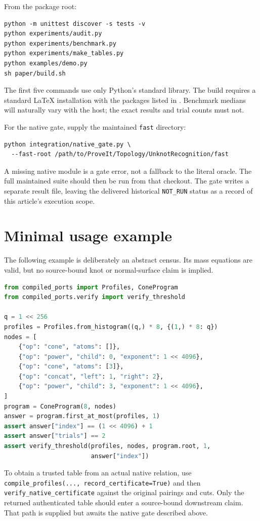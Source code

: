 From the package root:
\begin{lstlisting}
python -m unittest discover -s tests -v
python experiments/audit.py
python experiments/benchmark.py
python experiments/make_tables.py
python examples/demo.py
sh paper/build.sh
\end{lstlisting}
The first five commands use only Python's standard library. The build
requires a standard LaTeX installation with the packages listed in
. Benchmark medians will naturally vary with the host;
the exact results and trial counts must not.

For the native gate, supply the maintained \texttt{fast} directory:
\begin{lstlisting}
python integration/native_gate.py \
  --fast-root /path/to/ProveIt/Topology/UnknotRecognition/fast
\end{lstlisting}
A missing native module is a gate error, not a fallback to the literal
oracle. The full maintained suite should then be run from that checkout.
The gate writes a separate result file, leaving the delivered historical
\texttt{NOT\_RUN} status as a record of this article's execution scope.

\section{Minimal usage example}

The following example is deliberately an abstract census. Its mass equations
are valid, but no source-bound knot or normal-surface claim is implied.
\begin{lstlisting}[language=Python]
from compiled_ports import Profiles, ConeProgram
from compiled_ports.verify import verify_threshold

q = 1 << 256
profiles = Profiles.from_histogram((q,) * 8, {(1,) * 8: q})
nodes = [
    {"op": "cone", "atoms": []},
    {"op": "power", "child": 0, "exponent": 1 << 4096},
    {"op": "cone", "atoms": [3]},
    {"op": "concat", "left": 1, "right": 2},
    {"op": "power", "child": 3, "exponent": 1 << 4096},
]
program = ConeProgram(8, nodes)
answer = program.first_at_most(profiles, 1)
assert answer["index"] == (1 << 4096) + 1
assert answer["trials"] == 2
assert verify_threshold(profiles, nodes, program.root, 1,
                        answer["index"])
\end{lstlisting}

To obtain a trusted table from an actual native relation, use
\texttt{compile\_profiles(..., record\_certificate=True)} and then
\texttt{verify\_native\_certificate} against the original pairings and cuts.
Only the returned authenticated table should enter a source-bound downstream
claim. That path is supplied but awaits the native gate described above.
